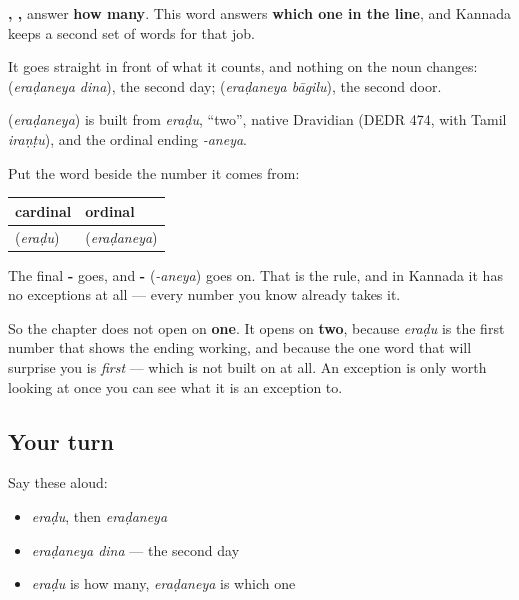 \textbf{, , } answer \textbf{how many}. This word answers \textbf{which one in the line}, and Kannada keeps a second set of words for that job.

It goes straight in front of what it counts, and nothing on the noun changes: \textbf{ } (\emph{eraḍaneya dina}), the second day; \textbf{ } (\emph{eraḍaneya bāgilu}), the second door.

\begin{cousinweb}
\textbf{} (\emph{eraḍaneya}) is built from \emph{eraḍu}, \textquotedblleft{}two\textquotedblright{}, native Dravidian (DEDR 474, with Tamil \emph{iraṇṭu}), and the ordinal ending \emph{-aneya}.
\end{cousinweb}

\begin{grammarlens}[title={Grammar Lens: the ending, and why the chapter opens on two}]
Put the word beside the number it comes from:

\noindent
\begin{tabularx}{\linewidth}{@{}>{\raggedright\arraybackslash}X>{\raggedright\arraybackslash}X@{}}
\toprule
\textbf{cardinal} & \textbf{ordinal} \\
\midrule
\textbf{\kn{ಎರಡು}} (\emph{eraḍu}) & \textbf{\kn{ಎರಡನೆಯ}} (\emph{eraḍaneya}) \\
\bottomrule
\end{tabularx}

The final \textbf{-} goes, and \textbf{-} (\emph{-aneya}) goes on. That is the rule, and in Kannada it has no exceptions at all — every number you know already takes it.

So the chapter does not open on \textbf{one}. It opens on \textbf{two}, because \emph{eraḍu} is the first number that shows the ending working, and because the one word that will surprise you is \emph{first} — which is not built on \textbf{} at all. An exception is only worth looking at once you can see what it is an exception to.
\end{grammarlens}

\subsection*{Your turn}
Say these aloud:

\begin{itemize}
\raggedright
  \item \emph{eraḍu}, then \emph{eraḍaneya}
  \item \emph{eraḍaneya dina} — the second day
  \item \emph{eraḍu} is how many, \emph{eraḍaneya} is which one
\end{itemize}

